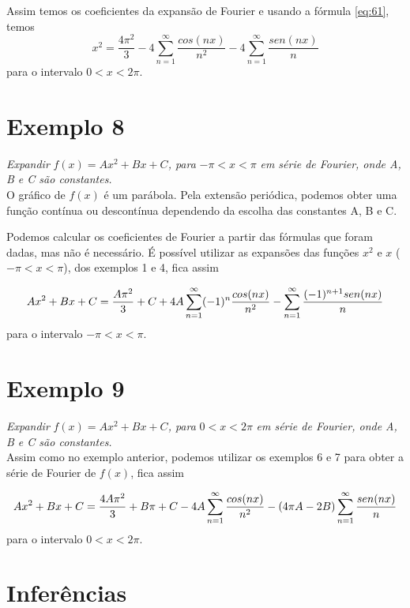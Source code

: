 Assim temos os coeficientes da expansão de Fourier e usando a fórmula \ref{eq:61}, temos
\begin{equation}
\label{eq:exemplo7SF}
    x^2 = \dfrac{4\pi^2}{3} - 4\sum\limits_{n=1}^{\infty}\dfrac{cos(nx)}{n^2} - 4\sum\limits_{n=1}^{\infty}\dfrac{sen(nx)}{n}
\end{equation}
para o intervalo $0 < x < 2\pi$.

\section*{Exemplo 8}

\textit{Expandir }$f(x) = Ax^2 + Bx + C$\textit{, para }$-\pi < x < \pi$\textit{ em série de Fourier, onde A, B e C
são constantes.}\\

O gráfico de $f(x)$ é um parábola. Pela extensão periódica, podemos obter uma função contínua ou descontínua 
dependendo da escolha das constantes A, B e C. 

Podemos calcular os coeficientes de Fourier a partir das fórmulas que foram dadas, mas não 
é necessário. É possível utilizar as expansões das funções $x^2$ e $x$ ($-\pi < x < \pi$), 
dos exemplos 1 e 4, fica assim

\begin{equation}
\notag
    Ax^2 + Bx + C = \dfrac{A\pi^2}{3} + C + 4A\sum\limits_{n=1}^{\infty}(-1)^n \dfrac{cos(nx)}{n^2} - \sum\limits_{n=1}^{\infty}\dfrac{(-1)^{n + 1}sen(nx)}{n}
\end{equation}
para o intervalo $ -\pi < x < \pi$.


\section*{Exemplo 9}
\textit{Expandir }$f(x) = Ax^2 + Bx + C$\textit{, para }$0 < x < 2\pi$\textit{ em série de Fourier, onde A, B e C
são constantes.}\\

Assim como no exemplo anterior, podemos utilizar os exemplos 6 e 7 para obter a série de Fourier 
de $f(x)$, fica assim

\begin{equation}
\notag
    Ax^2 + Bx + C = \dfrac{4A\pi^2}{3} + B\pi + C - 4A\sum\limits_{n=1}^{\infty}\dfrac{cos(nx)}{n^2} - (4\pi A - 2B)\sum\limits_{n=1}^{\infty}\dfrac{sen(nx)}{n}
\end{equation}
para o intervalo $0 < x < 2\pi$.

\section*{Inferências}

